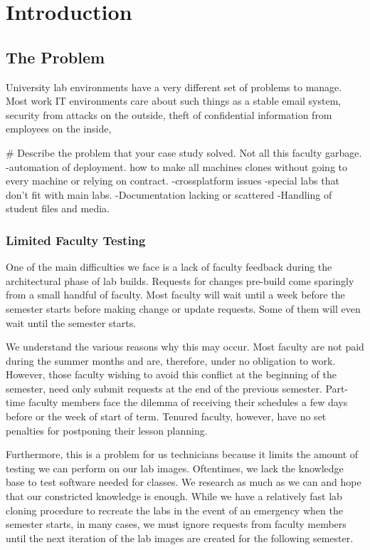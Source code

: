 \chapter{Introduction} \label{ch:introduction}
\section{The Problem} \label{sec:the_problem}
University lab environments have a very different set of problems to manage.  Most work IT environments care about such things as a stable email system, security from attacks on the outside, theft of confidential information from employees on the inside,

# Describe the problem that your case study solved. Not all this faculty garbage.  
-automation of deployment. how to make all machines clones without going to every machine or relying on contract. 
-crossplatform issues
-special labs that don't fit with main labs.
-Documentation lacking or scattered
-Handling of student files and media. 

\subsection{Limited Faculty Testing}
One of the main difficulties we face is a lack of faculty feedback during the architectural phase of lab builds.  Requests for changes pre-build come sparingly from a small handful of faculty.  Most faculty will wait until a week before the semester starts before making change or update requests.  Some of them will even wait until the semester starts.

We understand the various reasons why this may occur.  Most faculty are not paid during the summer months and are, therefore, under no obligation to work.  However, those faculty wishing to avoid this conflict at the beginning of the semester, need only submit requests at the end of the previous semester.  Part-time faculty members face the dilemma of receiving their schedules a few days before or the week of start of term.  Tenured faculty, however, have no set penalties for postponing their lesson planning.  

Furthermore, this is a problem for us technicians because it limits the amount of testing we can perform on our lab images.  Oftentimes, we lack the knowledge base to test software needed for classes.  We research as much as we can and hope that our constricted knowledge is enough.  While we have a relatively fast lab cloning procedure to recreate the labs in the event of an emergency when the semester starts, in many cases, we must ignore requests from faculty members until the next iteration of the lab images are created for the following semester. 

